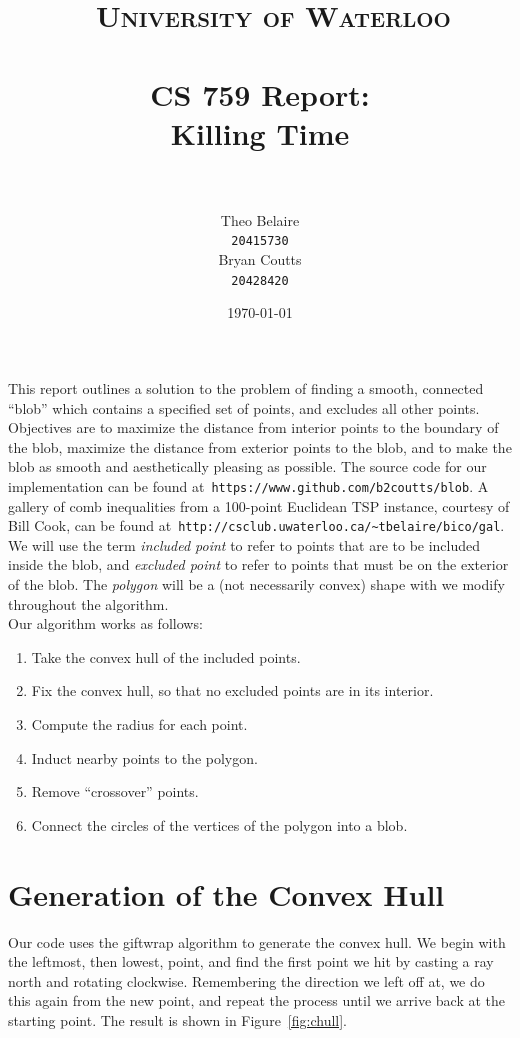 \documentclass[paper=a4, fontsize=11pt]{scrartcl} %
\title{\
    \normalfont\normalsize
    \textsc{University of Waterloo} \\ [25pt] %
    \horrule{0.5pt} \\[0.4cm] %
    \huge CS 759 Report:\\
    Killing Time \\
    \horrule{2pt} \\[0.5cm] %
}
\author{Theo Belaire \\ \texttt{20415730} \\ Bryan Coutts \\ \texttt{20428420}} %
\date{\normalsize\today} %
\numberwithin{equation}{section} %
\numberwithin{figure}{section} %
\numberwithin{table}{section} %
\begin{document}
\maketitle %

This report outlines a solution to the problem of finding a smooth, connected
``blob'' which contains a specified set of points, and excludes all other
points. Objectives are to maximize the distance from interior points to the
boundary of the blob, maximize the distance from exterior points to the blob,
and to make the blob as smooth and aesthetically pleasing as possible. The
source code for our implementation can be found at\,
\verb|https://www.github.com/b2coutts/blob|. A gallery of comb inequalities from
a 100-point Euclidean TSP instance, courtesy of Bill Cook, can be found at\,
\verb|http://csclub.uwaterloo.ca/~tbelaire/bico/gal|. \\

We will use the term \textit{included point} to refer to points that are to be
included inside the blob, and \textit{excluded point} to refer to points that
must be on the exterior of the blob. The \textit{polygon} will be a (not
necessarily convex) shape with we modify throughout the algorithm. \\

Our algorithm works as follows:
\begin{enumerate}
\item Take the convex hull of the included points.
\item Fix the convex hull, so that no excluded points are in its interior.
\item Compute the radius for each point.
\item Induct nearby points to the polygon.
\item Remove ``crossover'' points.
\item Connect the circles of the vertices of the polygon into a blob.
\end{enumerate}


\section{Generation of the Convex Hull}
Our code uses the giftwrap algorithm to generate the convex hull. We begin with
the leftmost, then lowest, point, and find the first point we hit by casting a
ray north and rotating clockwise. Remembering the direction we left off at, we
do this again from the new point, and repeat the process until we arrive back at
the starting point. The result is shown in Figure~\ref{fig:chull}. \\
\end{document}
